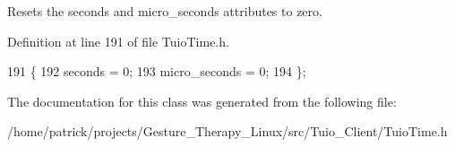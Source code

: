 Resets the seconds and micro\+\_\+seconds attributes to zero. 

Definition at line 191 of file Tuio\+Time.\+h.


\begin{DoxyCode}
191                      \{
192             seconds = 0;
193             micro\_seconds = 0;
194         \};
\end{DoxyCode}


The documentation for this class was generated from the following file\+:\begin{DoxyCompactItemize}
\item 
/home/patrick/projects/\+Gesture\+\_\+\+Therapy\+\_\+\+Linux/src/\+Tuio\+\_\+\+Client/Tuio\+Time.\+h\end{DoxyCompactItemize}
